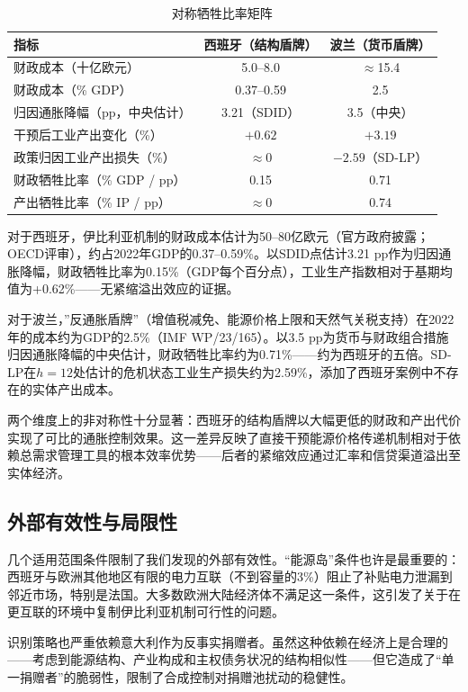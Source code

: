 \documentclass[12pt, a4paper]{article}
\begin{document}
\begin{table}[ht]
\centering
\caption{对称牺牲比率矩阵}
\label{tab:sacrifice_matrix}
\begin{tabular}{lcc}
\toprule
指标 & 西班牙（结构盾牌） & 波兰（货币盾牌） \\
\midrule
财政成本（十亿欧元） & 5.0--8.0 & $\approx$15.4 \\
财政成本（\% GDP） & 0.37--0.59 & 2.5 \\
归因通胀降幅（pp，中央估计） & 3.21（SDID） & 3.5（中央） \\
干预后工业产出变化（\%） & $+0.62$ & $+3.19$ \\
政策归因工业产出损失（\%） & $\approx 0$ & $-2.59$（SD-LP） \\
财政牺牲比率（\% GDP / pp） & 0.15 & 0.71 \\
产出牺牲比率（\% IP / pp） & $\approx 0$ & 0.74 \\
\bottomrule
\end{tabular}
\end{table}

对于西班牙，伊比利亚机制的财政成本估计为50--80亿欧元（官方政府披露；OECD评审），约占2022年GDP的0.37--0.59\%。以SDID点估计3.21 pp作为归因通胀降幅，财政牺牲比率为0.15\%（GDP每个百分点），工业生产指数相对于基期均值为+0.62\%——无紧缩溢出效应的证据。

对于波兰，”反通胀盾牌”（增值税减免、能源价格上限和天然气关税支持）在2022年的成本约为GDP的2.5\%（IMF WP/23/165）。以3.5 pp为货币与财政组合措施归因通胀降幅的中央估计，财政牺牲比率约为0.71\%——约为西班牙的五倍。SD-LP在$h=12$处估计的危机状态工业生产损失约为2.59\%，添加了西班牙案例中不存在的实体产出成本。

两个维度上的非对称性十分显著：西班牙的结构盾牌以大幅更低的财政和产出代价实现了可比的通胀控制效果。这一差异反映了直接干预能源价格传递机制相对于依赖总需求管理工具的根本效率优势——后者的紧缩效应通过汇率和信贷渠道溢出至实体经济。


\subsection{外部有效性与局限性}

几个适用范围条件限制了我们发现的外部有效性。“能源岛”条件也许是最重要的：西班牙与欧洲其他地区有限的电力互联（不到容量的3\%）阻止了补贴电力泄漏到邻近市场，特别是法国。大多数欧洲大陆经济体不满足这一条件，这引发了关于在更互联的环境中复制伊比利亚机制可行性的问题。

识别策略也严重依赖意大利作为反事实捐赠者。虽然这种依赖在经济上是合理的——考虑到能源结构、产业构成和主权债务状况的结构相似性——但它造成了“单一捐赠者”的脆弱性，限制了合成控制对捐赠池扰动的稳健性。
\end{document}
